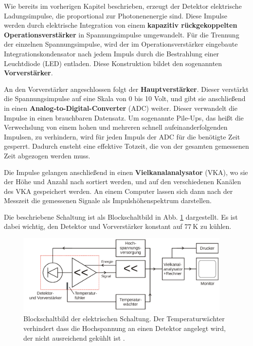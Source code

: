     Wie bereits im vorherigen Kapitel beschrieben, erzeugt der Detektor elektrische
    Ladungsimpulse, die proportional zur Photonenenergie sind. Diese Impulse werden durch
    elektrische Integration von einem \textbf{kapazitiv rückgekoppelten Operationsverstärker}
    in Spannungsimpulse umgewandelt. Für die Trennung der einzelnen Spannungsimpulse, wird
    der im Operationsverstärker eingebaute Integrationskondensator nach jedem Impuls durch die
    Bestrahlung einer Leuchtdiode (LED) entladen. Diese Konstruktion bildet den sogenannten \textbf{Vorverstärker}.

    An den Vorverstärker angeschlossen folgt der \textbf{Hauptverstärker}.
    Dieser verstärkt die Spannungsimpulse auf eine Skala von 0 bis 10 Volt, und
    gibt sie anschließend in einen \textbf{Analog-to-Digital-Converter} (ADC) weiter.
    Dieser verwandelt die Impulse in einen brauchbaren Datensatz. Um sogenannte Pile-Ups, das
    heißt die Verwechslung von einem hohen und mehreren schnell aufeinanderfolgenden Impulsen,
    zu verhindern, wird für jeden Impuls der ADC für die benötigte Zeit gesperrt. Dadurch
    ensteht eine effektive Totzeit, die von der gesamten gemessenen Zeit abgezogen werden muss.

    Die Impulse gelangen anschließend in einen \textbf{Vielkanalanalysator} (VKA), wo
    sie der Höhe und Anzahl nach sortiert werden, und auf den verschiedenen Kanälen des VKA
    gespeichert werden. An einem Computer lassen sich dann nach der Messzeit die gemessenen
    Signale als Impulshöhenspektrum darstellen.

    Die beschriebene Schaltung ist als Blockschaltbild in Abb. \ref{fig:blockschaltbild}
    dargestellt. Es ist dabei wichtig, den Detektor und Vorverstärker konstant auf $\SI{77}{\kelvin}$
    zu kühlen.

    \begin{figure}
      \centering
      \includegraphics[width=0.95\textwidth]{blockschaltung.png}
      \caption{Blockschaltbild der elektrischen Schaltung. Der Temperaturwächter verhindert dass die Hochspannung
      an einen Detektor angelegt wird, der nicht ausreichend gekühlt ist \cite{anleitungv18}.}
      \label{fig:blockschaltbild}
    \end{figure}

